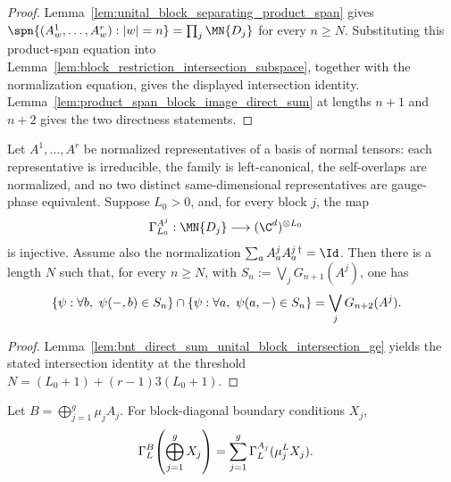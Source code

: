 \begin{proof}
    \leanok
    Lemma~\ref{lem:unital_block_separating_product_span} gives
    $\spn\{(A^1_w,\ldots,A^r_w):|w|=n\} =\prod_j\MN{D_j}$
    for every $n\ge N$. Substituting this product-span equation into
    Lemma~\ref{lem:block_restriction_intersection_subspace}, together with the
    normalization equation, gives the displayed intersection identity.
    Lemma~\ref{lem:product_span_block_image_direct_sum} at lengths $n+1$ and
    $n+2$ gives the two directness statements.
\end{proof}

\begin{lemma}
    \label{lem:bnt_direct_sum_unital_block_intersection}
    \leanok
    Let $A^1,\ldots,A^r$ be normalized representatives of a basis of normal
    tensors: each representative is irreducible, the family is left-canonical,
    the self-overlaps are normalized, and no two distinct same-dimensional
    representatives are gauge-phase equivalent. Suppose $L_0>0$, and, for
    every block $j$, the map
    \begin{align}
        \Gamma_{L_0}^{A^j}:\MN{D_j}
         & \longrightarrow(\C^d)^{\otimes L_0}
        \notag
    \end{align}
    is injective. Assume also the normalization
    $\sum_a A^j_aA^{j\,\dagger}_a=\Id$. Then there is a length $N$ such that,
    for every $n\ge N$, with $S_n:=\bigvee_jG_{n+1}(A^j)$, one has
    \begin{align}
         & \left\{\psi:\forall b,\ \psi(-,b)\in S_n\right\}
        \cap
        \left\{\psi:\forall a,\ \psi(a,-)\in S_n\right\} =\bigvee_jG_{n+2}(A^j).
        \notag
    \end{align}
\end{lemma}

\begin{proof}
    \leanok
    Lemma~\ref{lem:bnt_direct_sum_unital_block_intersection_ge} yields the
    stated intersection identity at the threshold $N=(L_0+1)+(r-1)3(L_0+1)$.
\end{proof}

\begin{lemma}
    \label{lem:block_diagonal_boundary_condition_sum}
    \leanok
    Let $B=\bigoplus_{j=1}^g\mu_jA_j$. For block-diagonal boundary conditions
    $X_j$,
    \begin{align}
        \Gamma_L^B\!\left(\bigoplus_{j=1}^g X_j\right)
         & =\sum_{j=1}^g\Gamma_L^{A_j}(\mu_j^LX_j).
        \notag
    \end{align}
\end{lemma}

